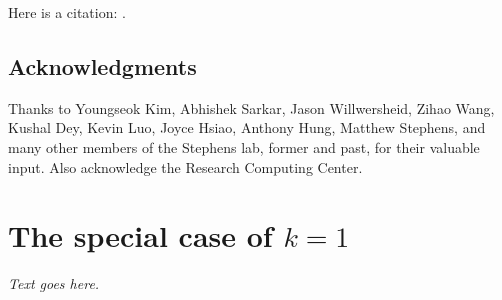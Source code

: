 \documentclass[final]{siamart171218}
\begin{document}
Here is a citation: \cite{lee-2001}.

\subsection*{Acknowledgments}

Thanks to Youngseok Kim, Abhishek Sarkar, Jason Willwersheid, Zihao
Wang, Kushal Dey, Kevin Luo, Joyce Hsiao, Anthony Hung, Matthew
Stephens, and many other members of the Stephens lab, former and past,
for their valuable input. Also acknowledge the Research Computing
Center.

\appendix

\section{The special case of $k = 1$}
\label{sec:k=1}

{\em Text goes here.}



\end{document}
